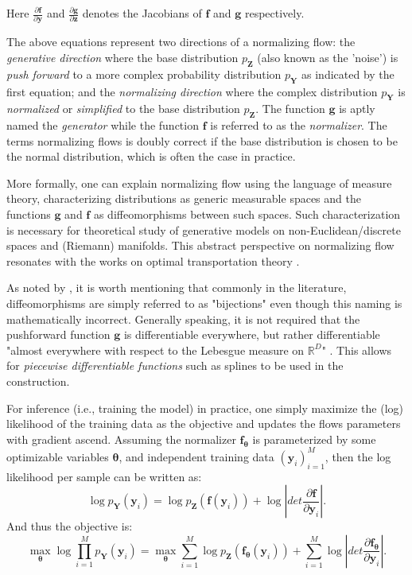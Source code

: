 Here $\frac{\partial \mathbf{f}}{\partial \mathbf{y} }$ and $\frac{\partial
\mathbf{g}}{\partial \mathbf{z}}$ denotes the Jacobians of $\mathbf{f}$ and
$\mathbf{g}$ respectively.

The above equations represent two directions of a normalizing flow:
the \textit{generative direction} where the base
distribution $p_{\mathbf{Z}}$ (also known as the 'noise') is \textit{push forward} to a more complex probability
distribution $p_{\mathbf{Y}}$ as indicated by the first equation; and the \textit{normalizing
direction} where the complex distribution $p_{\mathbf{Y}}$ is \textit{normalized} or
\textit{simplified} to the base distribution $p_{\mathbf{Z}}$. The function $\mathbf{g}$ is
aptly named the \textit{generator} while the function $\mathbf{f}$ is
referred to as the \textit{normalizer}. The terms normalizing flows is doubly
correct if the base distribution is chosen to be the normal distribution,
which is often the case in practice.

More formally, one can explain normalizing flow using the language of measure
theory, characterizing distributions as generic measurable spaces and the
functions $\mathbf{g}$ and $\mathbf{f}$ as diffeomorphisms between such spaces.
Such characterization is necessary for theoretical study of generative models on
non-Euclidean/discrete spaces and (Riemann) manifolds. This abstract perspective
on normalizing flow resonates with the works on optimal transportation theory
\citep{villaniTopicsOptimalTransportation2003}.

As noted by \citep{kobyzevNormalizingFlowsIntroduction2021}, it is worth
mentioning that commonly in the literature, diffeomorphisms are simply referred
to as "bijections" even though this naming is mathematically incorrect.
Generally speaking, it is not required that the pushforward function
$\mathbf{g}$ is differentiable everywhere, but rather differentiable "almost
everywhere with respect to the Lebesgue measure on $\mathbb{R}^D$"
\cite{kobyzevNormalizingFlowsIntroduction2021}. This allows
for \textit{piecewise differentiable functions} such as splines to be used in
the construction.

For inference (i.e., training the model) in practice, one simply maximize the
(log) likelihood of the training data as the objective and updates the flows
parameters with gradient ascend. Assuming the normalizer $\mathbf{f}_{\bm{\theta}}$ is
parameterized by some optimizable variables $\bm{\theta}$, and
independent training data
$(\mathbf{y}_i)_{i=1}^M$, then the log likelihood per sample can be written as:
$$
 \log p_{\mathbf{Y}}(\mathbf{y}_i) = \log p_{\mathbf{Z}}(\mathbf{f}(\mathbf{y}_i))
  + \log \left|det
  \frac{\partial \mathbf{f}}{\partial \mathbf{y}_i} \right|
.$$
And thus the objective is:
$$
\max_{\bm{\theta}} \log \prod_{i=1}^M p_{\mathbf{Y}}(\mathbf{y}_i) =
\max_{\bm{\theta}} \sum_{i=1}^{M}\log p_{\mathbf{Z}}(\mathbf{f}_{\bm{\theta}}(\mathbf{y}_i))
  +  \sum_{i=1}^{M} \log \left|det
  \frac{\partial \mathbf{f}_{\bm{\theta}}}{\partial \mathbf{y}_i} \right|
.$$

